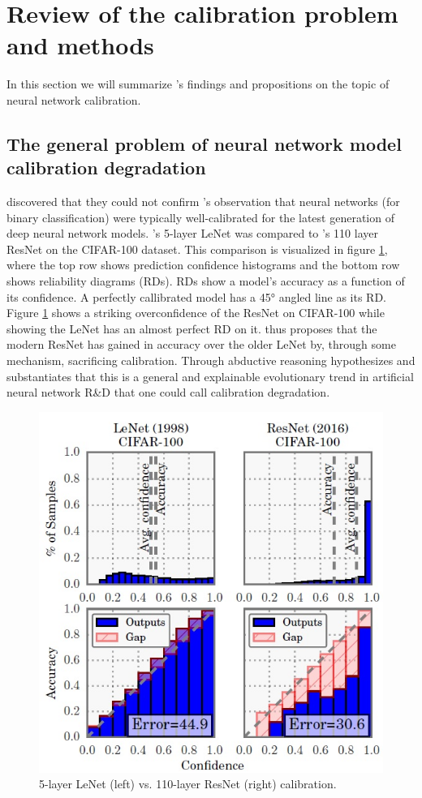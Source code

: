 \section{Review of the calibration problem and methods}
In this section we will summarize \cite{guo2017calibration}'s findings and propositions on the topic of neural network calibration.

\subsection{The general problem of neural network model calibration degradation}
\cite{guo2017calibration} discovered that they could not confirm \cite{niculescu2005predicting}'s observation that neural networks (for binary classification) were typically well-calibrated for the latest generation of deep neural network models. \cite{lecun1998gradient}'s 5-layer LeNet was compared to \cite{he2016deep}'s 110 layer ResNet on the CIFAR-100 dataset. This comparison is visualized in figure \ref{fig:lenet_vs_resnet_calibration_guo_et_al}, where the top row shows prediction confidence histograms and the bottom row shows reliability diagrams (RDs). RDs show a model's accuracy as a function of its confidence. A perfectly callibrated model has a 45° angled line as its RD. Figure \ref{fig:lenet_vs_resnet_calibration_guo_et_al} shows a striking overconfidence of the ResNet on CIFAR-100 while showing the LeNet has an almost perfect RD on it. \cite{guo2017calibration} thus proposes that the modern ResNet has gained in accuracy over the older LeNet by, through some mechanism, sacrificing calibration. Through abductive reasoning \cite{guo2017calibration} hypothesizes and substantiates that this is a general and explainable evolutionary trend in artificial neural network R\&D that one could call calibration degradation. 

\begin{figure}[htbp!]
  \centering
  \includegraphics[width=0.6\linewidth]{images/lenet_vs_resnet_calibration_guo_et_al.jpg}
  \caption[5-layer LeNet's vs. 110-layer ResNet's calibration.]{5-layer LeNet (left) vs. 110-layer ResNet (right) calibration.}
  \label{fig:lenet_vs_resnet_calibration_guo_et_al}
\end{figure}
\newpage

